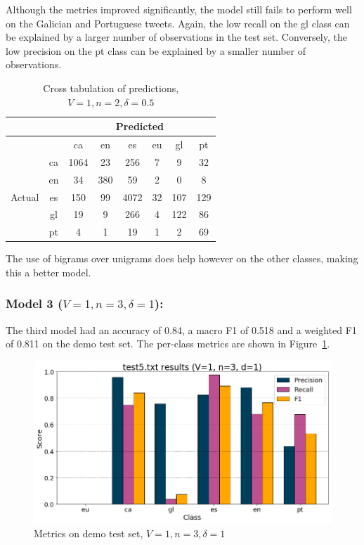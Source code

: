 \documentclass[runningheads]{llncs}
\begin{document}
Although the metrics improved significantly, the model still fails to perform well on the Galician and Portuguese tweets. Again, the low recall on the gl class can be explained by a larger number of observations in the test set. Conversely, the low precision on the pt class can be explained by a smaller number of observations.

\begin{table}
	\centering
	\caption{Cross tabulation of predictions, $V=1, n=2, \delta=0.5$}
	\label{tab:demo_confusion_1_2_0.5}
	\begin{tabular}{|c|c|c|c|c|c|c|c|} \hline
	    & & \multicolumn{6}{c|}{Predicted} \\ \hline
		& &    ca &   en &    es &  eu &   gl &   pt \\ \hline
		\multirow{6}{*}{Actual} & ca   &  1064 &   23 &   256 &   7 &    9 &   32 \\
		& en   &    34 &  380 &    59 &   2 &    0 &    8 \\
		& es   &   150 &   99 &  4072 &  32 &  107 &  129 \\
		& gl   &    19 &    9 &   266 &   4 &  122 &   86 \\
		& pt   &     4 &    1 &    19 &   1 &    2 &   69 \\ \hline
	\end{tabular}
\end{table}

The use of bigrams over unigrams does help however on the other classes, making this a better model.

\subsubsection{Model 3 ($V=1, n=3, \delta=1$): }
The third model had an accuracy of 0.84, a macro F1 of 0.518 and a weighted F1 of 0.811 on the demo test set. The per-class metrics are shown in Figure~\ref{fig:demo_1_3_1}.

\begin{figure}
    \begin{center}
        \includegraphics[width=12.5cm]{images/test5_results_1_3_1.png}
        \caption{Metrics on demo test set, $V=1, n=3, \delta=1$}
        \label{fig:demo_1_3_1}
    \end{center}
\end{figure}
\end{document}

